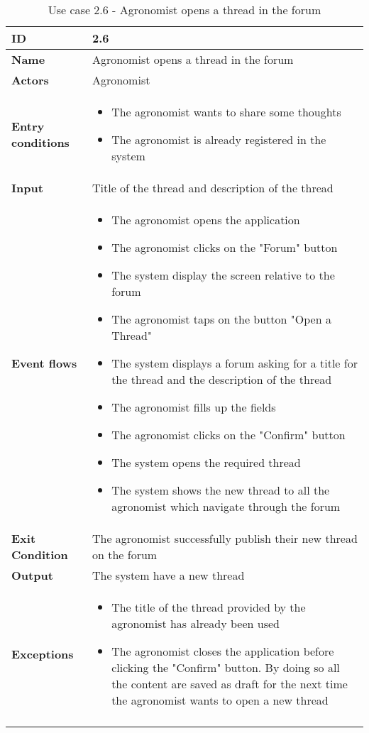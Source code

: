 \begin{longtable}[H]{ | l | p{10cm} | }
\hline
{\cellcolor[rgb]{0.753,0.753,0.753}}\textbf{ID}  & 2.6 \\ \hline
{\cellcolor[rgb]{0.753,0.753,0.753}}\textbf{Name} & Agronomist opens a thread in the forum \\ \hline
{\cellcolor[rgb]{0.753,0.753,0.753}}\textbf{Actors} & Agronomist \\ \hline
{\cellcolor[rgb]{0.753,0.753,0.753}}\textbf{Entry conditions} &
\begin{itemize}
    \item The agronomist wants to share some thoughts
    \item The agronomist is already registered in the system
\end{itemize}
\\ \hline
{\cellcolor[rgb]{0.753,0.753,0.753}}\textbf{Input} & Title of the thread and description of the thread\\ \hline
{\cellcolor[rgb]{0.753,0.753,0.753}}\textbf{Event flows} &
\begin{itemize}
    \item The agronomist opens the application
    \item The agronomist clicks on the "Forum" button
    \item The system display the screen relative to the forum
    \item The agronomist taps on the button "Open a Thread"
    \item The system displays a forum asking for a title for the thread and the description of the thread
    \item The agronomist fills up the fields
    \item The agronomist clicks on the "Confirm" button
    \item The system opens the required thread
    \item The system shows the new thread to all the agronomist which navigate through the forum
\end{itemize}
\\ \hline
{\cellcolor[rgb]{0.753,0.753,0.753}}\textbf{Exit Condition} & The agronomist successfully publish their new thread on the forum\\ \hline
{\cellcolor[rgb]{0.753,0.753,0.753}}\textbf{Output} & 
The system have a new thread
\\ \hline
{\cellcolor[rgb]{0.753,0.753,0.753}}\textbf{Exceptions} & 
\begin{itemize}
    \item The title of the thread provided by the agronomist has already been used
    \item The agronomist closes the application before clicking the "Confirm" button. By doing so all the content are saved as draft for the next time the agronomist wants to open a new thread 

\end{itemize}
\\ \hline
\caption{Use case 2.6 - Agronomist opens a thread in the forum}
\\
\end{longtable}